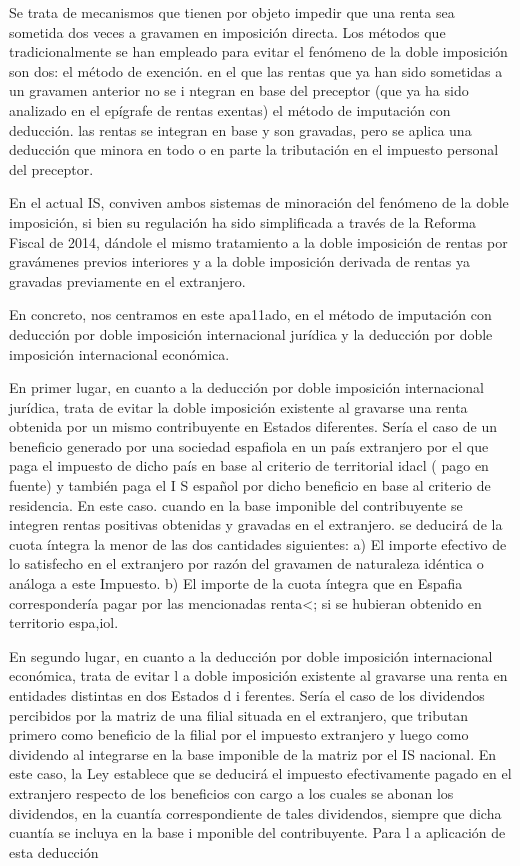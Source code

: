 \documentclass[10pt,a4paper]{article}
\begin{document}
Se trata de mecanismos que tienen por objeto impedir que una renta sea sometida dos veces a gravamen en imposición directa.
Los métodos que tradicionalmente se han empleado para evitar el fenómeno de la doble imposición son dos:
el método de exención. en el que las rentas que ya han sido sometidas a un gravamen anterior no se i ntegran en base del preceptor (que ya ha sido analizado en el epígrafe de rentas exentas)
el método de imputación con deducción. las rentas se integran en base y son gravadas, pero se aplica una deducción que minora en todo o en parte la tributación en el impuesto personal del preceptor.

En el actual IS, conviven ambos sistemas de minoración del fenómeno de la doble imposición, si bien su regulación ha sido simplificada a través de la Reforma Fiscal de 2014, dándole el mismo tratamiento a la doble imposición de rentas por gravámenes previos interiores y a la doble imposición derivada de rentas ya gravadas previamente en el extranjero.

En concreto, nos centramos en este apa11ado, en el método de imputación con deducción por doble imposición internacional jurídica y la deducción por doble imposición internacional económica.

En primer lugar, en cuanto a la deducción por doble imposición internacional jurídica, trata de evitar la doble imposición existente al gravarse una renta obtenida por un mismo contribuyente en Estados diferentes. Sería el caso de un beneficio generado por una sociedad espafiola en un país extranjero por el que paga el impuesto de dicho país en base al criterio de territorial idacl ( pago en fuente) y también paga el I S español por dicho beneficio en base al criterio de residencia. En este caso. cuando en la base imponible del contribuyente se integren rentas positivas obtenidas y gravadas en el extranjero. se deducirá de la cuota íntegra la menor de las dos cantidades siguientes:
a) El importe efectivo de lo satisfecho en el extranjero por razón del gravamen de naturaleza idéntica o análoga a este Impuesto.
b) El importe de la cuota íntegra que en Espafia correspondería pagar por las mencionadas renta<; si se hubieran obtenido en territorio espa,iol.

En segundo lugar, en cuanto a la deducción por doble imposición internacional económica, trata de evitar l a doble imposición existente al gravarse una renta en entidades distintas en dos Estados d i ferentes. Sería el caso de los dividendos percibidos por la matriz de una filial situada en el extranjero, que tributan primero como beneficio de la filial por el impuesto extranjero y luego como dividendo al integrarse en la base imponible de la matriz por el IS nacional. En este caso, la Ley establece que se deducirá el impuesto efectivamente pagado en el extranjero respecto de los beneficios con cargo a los cuales se abonan los dividendos, en la cuantía correspondiente de tales dividendos, siempre que dicha cuantía se incluya en la base i mponible del contribuyente. Para l a aplicación de esta deducción
\end{document}
